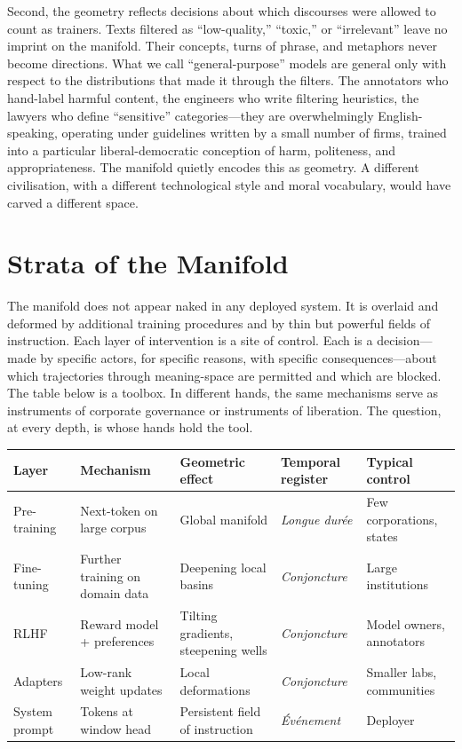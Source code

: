 Second, the geometry reflects decisions about which discourses were allowed to count as trainers. Texts filtered as ``low-quality,'' ``toxic,'' or ``irrelevant'' leave no imprint on the manifold. Their concepts, turns of phrase, and metaphors never become directions. What we call ``general-purpose'' models are general only with respect to the distributions that made it through the filters. The annotators who hand-label harmful content, the engineers who write filtering heuristics, the lawyers who define ``sensitive'' categories---they are overwhelmingly English-speaking, operating under guidelines written by a small number of firms, trained into a particular liberal-democratic conception of harm, politeness, and appropriateness. The manifold quietly encodes this as geometry. A different civilisation, with a different technological style and moral vocabulary, would have carved a different space.


\section{Strata of the Manifold}

The manifold does not appear naked in any deployed system. It is overlaid and deformed by additional training procedures and by thin but powerful fields of instruction. Each layer of intervention is a site of control. Each is a decision---made by specific actors, for specific reasons, with specific consequences---about which trajectories through meaning-space are permitted and which are blocked. The table below is a toolbox. In different hands, the same mechanisms serve as instruments of corporate governance or instruments of liberation. The question, at every depth, is whose hands hold the tool.

\begin{formalbox}[title={Strata of the manifold}]
\begin{tabular}{@{}lllll@{}}
\toprule
\textbf{Layer} & \textbf{Mechanism} & \textbf{Geometric effect} & \textbf{Temporal register} & \textbf{Typical control} \\
\midrule
Pre-training   & Next-token on large corpus & Global manifold                & \emph{Longue dur\'{e}e} & Few corporations, states \\
Fine-tuning    & Further training on domain data& Deepening local basins     & \emph{Conjoncture}      & Large institutions        \\
RLHF           & Reward model + preferences & Tilting gradients, steepening wells & \emph{Conjoncture} & Model owners, annotators  \\
Adapters       & Low-rank weight updates    & Local deformations             & \emph{Conjoncture}      & Smaller labs, communities \\
System prompt  & Tokens at window head      & Persistent field of instruction& \emph{\'{E}v\'{e}nement} & Deployer                  \\
\bottomrule
\end{tabular}
\end{formalbox}

